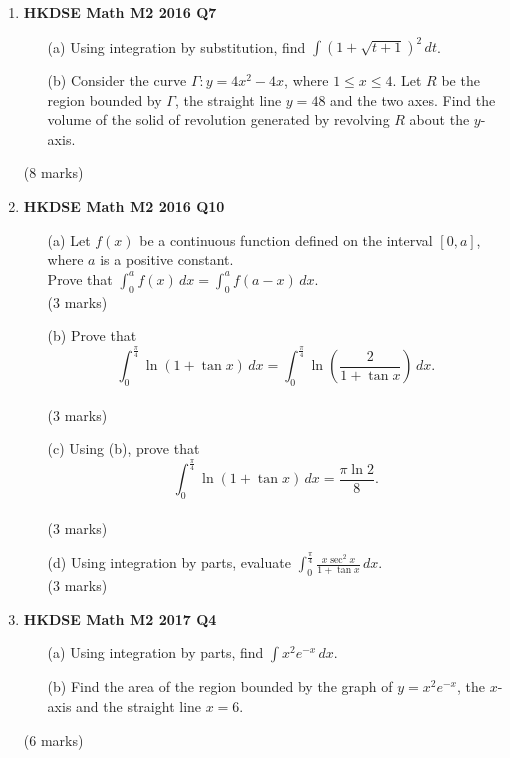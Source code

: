 \documentclass{report}
\begin{document}
\begin{enumerate}
	\item \textbf{HKDSE Math M2 2016 Q7}
	\begin{enumerate}
		\item [(a)]Using integration by substitution, find $\displaystyle\int (1+\sqrt{t+1})^2 \,dt$. 
		\item [(b)]Consider the curve $\Gamma : y = 4x^2 - 4x$, where $1 \leq x \leq 4$. Let $R$ be the region bounded by $\Gamma$, the straight line $y=48$ and the two axes. Find the volume of the solid of revolution generated by revolving $R$ about the $y$-axis.
	\end{enumerate}
	(8 marks)

	\item \textbf{HKDSE Math M2 2016 Q10}
	\begin{enumerate}
		\item [(a)]Let $f(x)$ be a continuous function defined on the interval $[0,a]$, where $a$ is a positive constant. \\Prove that $\displaystyle\int_0^a f(x)\,dx = \int_0^a f(a-x)\,dx$. \\(3 marks)
		\item [(b)]Prove that $$\displaystyle\int_{0}^{\tfrac{\pi}{4}} \ln{(1+\tan{x})}\,dx = \int_{0}^{\tfrac{\pi}{4}} \ln{\left(\frac{2}{1+\tan{x}}\right)}\,dx.$$ \\(3 marks)
		\item [(c)]Using (b), prove that $$\displaystyle\int_{0}^{\tfrac{\pi}{4}} \ln {(1+\tan{x})}\,dx = \frac{\pi \ln 2}{8}.$$ \\(3 marks)
		\item [(d)]Using integration by parts, evaluate $\displaystyle\int_{ 0}^{\tfrac{\pi}{4}} \frac{x\sec^2{x}}{1+\tan{x}}\,dx$. \\(3 marks)
	\end{enumerate}

	\item \textbf{HKDSE Math M2 2017 Q4}	
	\begin{enumerate}
		\item [(a)]Using integration by parts, find $\displaystyle\int x^2 e^{-x} \,dx$. 
		\item [(b)]Find the area of the region bounded by the graph of $y = x^2 e^{-x}$, the $x$-axis and the straight line $x = 6$.
	\end{enumerate}
	(6 marks)
	
	\newpage


\end{enumerate}
\end{document}
